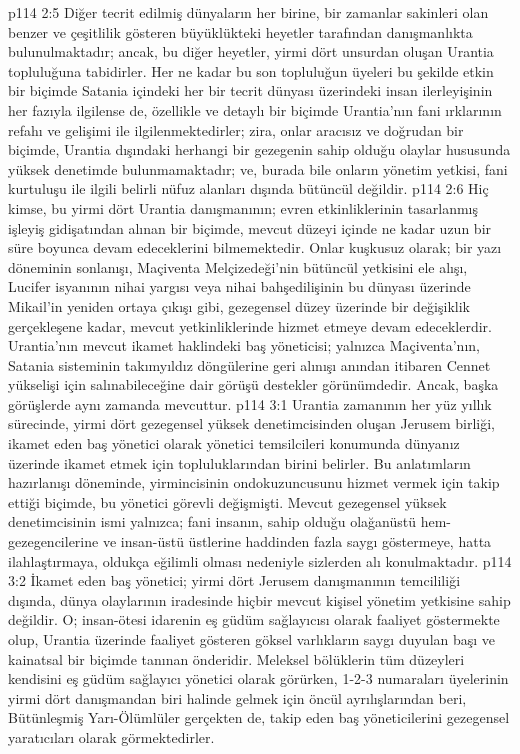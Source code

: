\vs p114 2:5 Diğer tecrit edilmiş dünyaların her birine, bir zamanlar sakinleri olan benzer ve çeşitlilik gösteren büyüklükteki heyetler tarafından danışmanlıkta bulunulmaktadır; ancak, bu diğer heyetler, yirmi dört unsurdan oluşan Urantia topluluğuna tabidirler. Her ne kadar bu son topluluğun üyeleri bu şekilde etkin bir biçimde Satania içindeki her bir tecrit dünyası üzerindeki insan ilerleyişinin her fazıyla ilgilense de, özellikle ve detaylı bir biçimde Urantia’nın fani ırklarının refahı ve gelişimi ile ilgilenmektedirler; zira, onlar aracısız ve doğrudan bir biçimde, Urantia dışındaki herhangi bir gezegenin sahip olduğu olaylar hususunda yüksek denetimde bulunmamaktadır; ve, burada bile onların yönetim yetkisi, fani kurtuluşu ile ilgili belirli nüfuz alanları dışında bütüncül değildir.
\vs p114 2:6 Hiç kimse, bu yirmi dört Urantia danışmanının; evren etkinliklerinin tasarlanmış işleyiş gidişatından alınan bir biçimde, mevcut düzeyi içinde ne kadar uzun bir süre boyunca devam edeceklerini bilmemektedir. Onlar kuşkusuz olarak; bir yazı döneminin sonlanışı, Maçiventa Melçizedeği’nin bütüncül yetkisini ele alışı, Lucifer isyanının nihai yargısı veya nihai bahşedilişinin bu dünyası üzerinde Mikail’in yeniden ortaya çıkışı gibi, gezegensel düzey üzerinde bir değişiklik gerçekleşene kadar, mevcut yetkinliklerinde hizmet etmeye devam edeceklerdir. Urantia’nın mevcut ikamet haklindeki baş yöneticisi; yalnızca Maçiventa’nın, Satania sisteminin takımyıldız döngülerine geri alınışı anından itibaren Cennet yükselişi için salınabileceğine dair görüşü destekler görünümdedir. Ancak, başka görüşlerde aynı zamanda mevcuttur.
\vs p114 3:1 Urantia zamanının her yüz yıllık sürecinde, yirmi dört gezegensel yüksek denetimcisinden oluşan Jerusem birliği, ikamet eden baş yönetici olarak yönetici temsilcileri konumunda dünyanız üzerinde ikamet etmek için topluluklarından birini belirler. Bu anlatımların hazırlanışı döneminde, yirmincisinin ondokuzuncusunu hizmet vermek için takip ettiği biçimde, bu yönetici görevli değişmişti. Mevcut gezegensel yüksek denetimcisinin ismi yalnızca; fani insanın, sahip olduğu olağanüstü hem\hyp{}gezegencilerine ve insan\hyp{}üstü üstlerine haddinden fazla saygı göstermeye, hatta ilahlaştırmaya, oldukça eğilimli olması nedeniyle sizlerden alı konulmaktadır.
\vs p114 3:2 İkamet eden baş yönetici; yirmi dört Jerusem danışmanının temcililiği dışında, dünya olaylarının iradesinde hiçbir mevcut kişisel yönetim yetkisine sahip değildir. O; insan\hyp{}ötesi idarenin eş güdüm sağlayıcısı olarak faaliyet göstermekte olup, Urantia üzerinde faaliyet gösteren göksel varlıkların saygı duyulan başı ve kainatsal bir biçimde tanınan önderidir. Meleksel bölüklerin tüm düzeyleri kendisini eş güdüm sağlayıcı yönetici olarak görürken, 1\hyp{}2\hyp{}3 numaraları üyelerinin yirmi dört danışmandan biri halinde gelmek için öncül ayrılışlarından beri, Bütünleşmiş Yarı\hyp{}Ölümlüler gerçekten de, takip eden baş yöneticilerini gezegensel yaratıcıları olarak görmektedirler.
